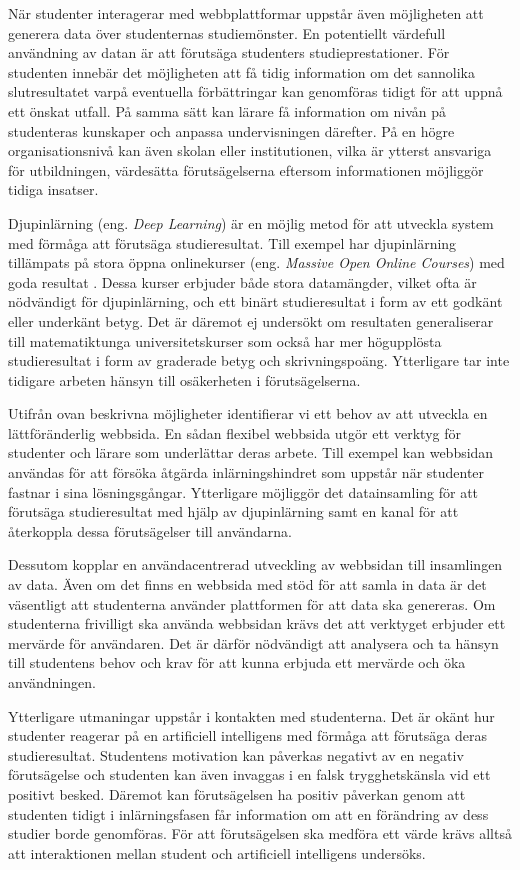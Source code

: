 När studenter interagerar med webbplattformar uppstår även möjligheten att generera data över studenternas studiemönster. En potentiellt värdefull användning av datan är att förutsäga studenters studieprestationer. För studenten innebär det möjligheten att få tidig information om det sannolika slutresultatet varpå eventuella förbättringar kan genomföras tidigt för att uppnå ett önskat utfall. På samma sätt kan lärare få information om nivån på studenteras kunskaper och anpassa undervisningen därefter. På en högre organisationsnivå kan även skolan eller institutionen, vilka är ytterst ansvariga för utbildningen, värdesätta förutsägelserna eftersom informationen möjliggör tidiga insatser.

Djupinlärning (eng. \emph{Deep Learning}) är en möjlig metod för att utveckla system med förmåga att förutsäga studieresultat. Till exempel har djupinlärning tillämpats på stora öppna onlinekurser (eng. \emph{Massive Open Online Courses}) med goda resultat \cite{Kim2018GritNetSP}. Dessa kurser erbjuder både stora datamängder, vilket ofta är nödvändigt för djupinlärning, och ett binärt studieresultat i form av ett godkänt eller underkänt betyg. Det är däremot ej undersökt om resultaten generaliserar till matematiktunga universitetskurser som också har mer högupplösta studieresultat i form av graderade betyg och skrivningspoäng. Ytterligare tar inte tidigare arbeten hänsyn till osäkerheten i förutsägelserna.

Utifrån ovan beskrivna möjligheter identifierar vi ett behov av att utveckla en lättföränderlig webbsida. En sådan flexibel webbsida utgör ett verktyg för studenter och lärare som underlättar deras arbete. Till exempel kan webbsidan användas för att försöka åtgärda inlärningshindret som uppstår när studenter fastnar i sina lösningsgångar. Ytterligare möjliggör det datainsamling för att förutsäga studieresultat med hjälp av djupinlärning samt en kanal för att återkoppla dessa förutsägelser till användarna.

Dessutom kopplar en användacentrerad utveckling av webbsidan till insamlingen av data. Även om det finns en webbsida med stöd för att samla in data är det väsentligt att studenterna använder plattformen för att data ska genereras. Om studenterna frivilligt ska använda webbsidan krävs det att verktyget erbjuder ett mervärde för användaren. Det är därför nödvändigt att analysera och ta hänsyn till studentens behov och krav för att kunna erbjuda ett mervärde och öka användningen.

Ytterligare utmaningar uppstår i kontakten med studenterna. Det är okänt hur studenter reagerar på en artificiell intelligens med förmåga att förutsäga deras studieresultat. Studentens motivation kan påverkas negativt av en negativ förutsägelse och studenten kan även invaggas i en falsk trygghetskänsla vid ett positivt besked. Däremot kan förutsägelsen ha positiv påverkan genom att studenten tidigt i inlärningsfasen får information om att en förändring av dess studier borde genomföras. För att förutsägelsen ska medföra ett värde krävs alltså att interaktionen mellan student och artificiell intelligens undersöks.


